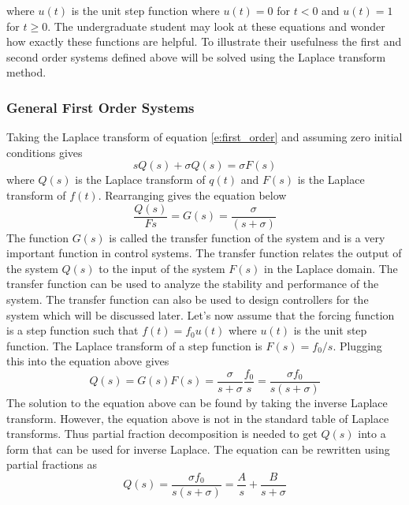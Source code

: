 \renewcommand{\arraystretch}{1} %
where $u(t)$ is the unit step function where $u(t)=0$ for $t<0$ and $u(t)=1$ for $t\geq0$. The undergraduate student may look at these equations and wonder how exactly these functions are helpful. To illustrate their usefulness the first and second order systems defined above will be solved using the Laplace transform method.

\subsubsection{General First Order Systems}

Taking the Laplace transform of equation \ref{e:first_order} and assuming zero initial conditions gives 
\begin{equation}
    sQ(s) + \sigma Q(s) = \sigma F(s)
\end{equation}
where $Q(s)$ is the Laplace transform of $q(t)$ and $F(s)$ is the Laplace transform of $f(t)$. Rearranging gives the equation below
\begin{equation}
    \frac{Q(s)}{F{s}} = G(s) = \frac{\sigma}{(s+\sigma)}
\end{equation}
The function $G(s)$ is called the transfer function of the system and is a very important function in control systems. The transfer function relates the output of the system $Q(s)$ to the input of the system $F(s)$ in the Laplace domain. The transfer function can be used to analyze the stability and performance of the system. The transfer function can also be used to design controllers for the system which will be discussed later. Let's now assume that the forcing function is a step function such that $f(t)=f_0u(t)$ where $u(t)$ is the unit step function. The Laplace transform of a step function is $F(s)=f_0/s$. Plugging this into the equation above gives
\begin{equation}
    Q(s) = G(s)F(s) = \frac{\sigma}{s+\sigma}\frac{f_0}{s} = \frac{\sigma f_0}{s(s+\sigma)}
\end{equation}
The solution to the equation above can be found by taking the inverse Laplace transform. However, the equation above is not in the standard table of Laplace transforms. Thus partial fraction decomposition is needed to get $Q(s)$ into a form that can be used for inverse Laplace. The equation can be rewritten using partial fractions as
\begin{equation}
    Q(s) = \frac{\sigma f_0}{s(s+\sigma)} = \frac{A}{s} + \frac{B}{s+\sigma}
\end{equation}
